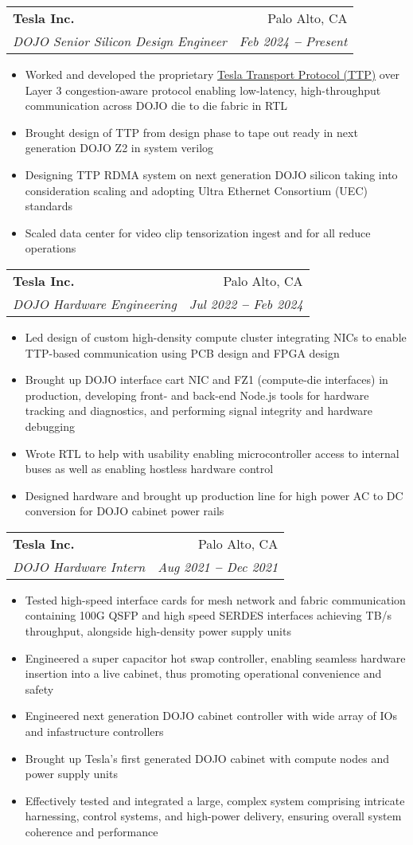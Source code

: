 \documentclass[letterpaper,11pt]{article}
\makeatletter
\newcommand{\resumeItem}[1]{
  \item\small{
    {#1 \vspace{-2pt}}
  }
}
\newcommand{\resumeSubheading}[4]{
  \vspace{-2pt}\item
    \begin{tabular*}{0.97\textwidth}[t]{l@{\extracolsep{\fill}}r}
      \textbf{#1} & #2 \\
      \textit{\small#3} & \textit{\small #4} \\
    \end{tabular*}\vspace{-7pt}
}
\newcommand{\resumeItemListStart}{\begin{itemize}}
\newcommand{\resumeItemListEnd}{\end{itemize}\vspace{-5pt}}
\makeatother
\begin{document}
  \resumeSubheading
    {Tesla Inc.}{Palo Alto, CA}
    {DOJO Senior Silicon Design Engineer}{Feb 2024 \textbf{--} Present}
    \resumeItemListStart
      \resumeItem{Worked and developed the proprietary \href{https://patentimages.storage.googleapis.com/be/ad/28/d9a3cf28a032ae/WO2024039793A1.pdf}{Tesla Transport Protocol (TTP)} over Layer 3 congestion-aware protocol enabling low-latency, high-throughput communication across DOJO die to die fabric in RTL}
      \resumeItem{Brought design of TTP from design phase to tape out ready in next generation DOJO Z2 in system verilog}
      \resumeItem{Designing TTP RDMA system on next generation DOJO silicon taking into consideration scaling and adopting Ultra Ethernet Consortium (UEC) standards}
      \resumeItem{Scaled data center for video clip tensorization ingest and for all reduce operations}
    \resumeItemListEnd

  \resumeSubheading
    {Tesla Inc.}{Palo Alto, CA}
    {DOJO Hardware Engineering}{Jul 2022 \textbf{--} Feb 2024}
    \resumeItemListStart
      \resumeItem{Led design of custom high-density compute cluster integrating NICs to enable TTP-based communication using PCB design and FPGA design}
      \resumeItem{Brought up DOJO interface cart NIC and FZ1 (compute-die interfaces) in production, developing front- and back-end Node.js tools for hardware tracking and diagnostics, and performing signal integrity and hardware debugging}
      \resumeItem{Wrote RTL to help with usability enabling microcontroller access to internal buses as well as enabling hostless hardware control}
      \resumeItem{Designed hardware and brought up production line for high power AC to DC conversion for DOJO cabinet power rails}
    \resumeItemListEnd

  \resumeSubheading
    {Tesla Inc.}{Palo Alto, CA}
    {DOJO Hardware Intern}{Aug 2021 \textbf{--} Dec 2021}
    \resumeItemListStart
      \resumeItem{Tested high-speed interface cards for mesh network and fabric communication containing 100G QSFP and high speed SERDES interfaces achieving TB/s throughput, alongside high-density power supply units}
      \resumeItem{Engineered a super capacitor hot swap controller, enabling seamless hardware insertion into a live cabinet, thus promoting operational convenience and safety}
      \resumeItem{Engineered next generation DOJO cabinet controller with wide array of IOs and infastructure controllers}
      \resumeItem{Brought up Tesla's first generated DOJO cabinet with compute nodes and power supply units}
      \resumeItem{Effectively tested and integrated a large, complex system comprising intricate harnessing, control systems, and high-power delivery, ensuring overall system coherence and performance}
    \resumeItemListEnd
\end{document}
